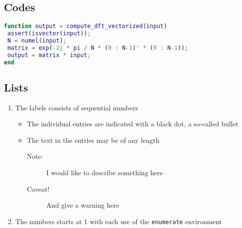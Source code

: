 \subsection{Codes} \label{sec:code}
\begin{lstlisting}[language=MATLAB, caption=Own DFT function to compute DFT directly, label={lst:dft}]
function output = compute_dft_vectorized(input)
 assert(isvector(input));
 N = numel(input);
 matrix = exp(-2j * pi / N * (0 : N-1)' * (0 : N-1));
 output = matrix * input;
end
\end{lstlisting}



\subsection{Lists} \label{sec:list}

\begin{enumerate}
   \item The labels consists of sequential numbers
   \begin{itemize}
     \item The individual entries are indicated with a black dot, a so-called bullet
     \item The text in the entries may be of any length
     \begin{description}
     \item[Note:] I would like to describe something here
     \item[Caveat!] And give a warning here
     \end{description}
   \end{itemize}
   \item The numbers starts at 1 with each use of the \texttt{enumerate} environment
\end{enumerate}